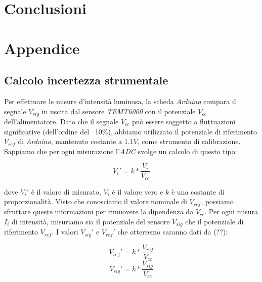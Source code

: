 \documentclass[12pt, a4paper, twoside]{article}
\begin{document}
\section{Conclusioni}\label{sec:conclusioni}
  \blindtext[2]

\newpage
\section{Appendice}\label{sec:appendice}
  \subsection{Calcolo incertezza strumentale}\label{subsec:calcolo-incertezza-strumentale}
    Per effettuare le misure d'intensità luminosa, la scheda \emph{Arduino} compara
    il segnale $V_{sig}$ in uscita dal sensore \emph{TEMT6000} con il potenziale
    $V_{cc}$ dell'alimentatore.
    Dato che il segnale $V_{cc}$ può essere soggetto a fluttuazioni significative %
    (dell'ordine del ~10\%), abbiamo utilizzato il potenziale di riferimento
    $V_{ref}$ di \emph{Arduino}, mantenuto costante a $1.1V$, come strumento di
    calibrazione.
    Sappiamo che per ogni misurazione l'\emph{ADC} svolge un calcolo di questo tipo:

    \begin{equation}
      V_i' = k * \frac {V_i} {V_{cc}}
    \end{equation}

    \noindent dove $V_i'$ è il valore di misurato, $V_i$ è il valore vero e $k$
    è una costante di proporzionalità. Visto che conosciamo il valore nominale
    di $V_{ref}$, possiamo sfruttare queste informazioni per rimuovere la
    dipendenza da $V_{cc}$. Per ogni misura $I_i$ di intensità, misuriamo sia
    il potenziale del sensore $V_{sig}$ che il potenziale di riferimento $V_{ref}$.
    I valori $V_{sig}'$ e $V_{ref}'$ che otterremo saranno dati da (??): %

    \vspace{-10mm}
    \begin{multicols}{2}
      \begin{equation}
        V_{ref}' = k * \frac {V_{ref}} {V_{cc}}
      \end{equation}
    \break
      \begin{equation}
        V_{sig}' = k * \frac {V_{sig}} {V_{cc}}
      \end{equation}
    \end{multicols}
\end{document}
